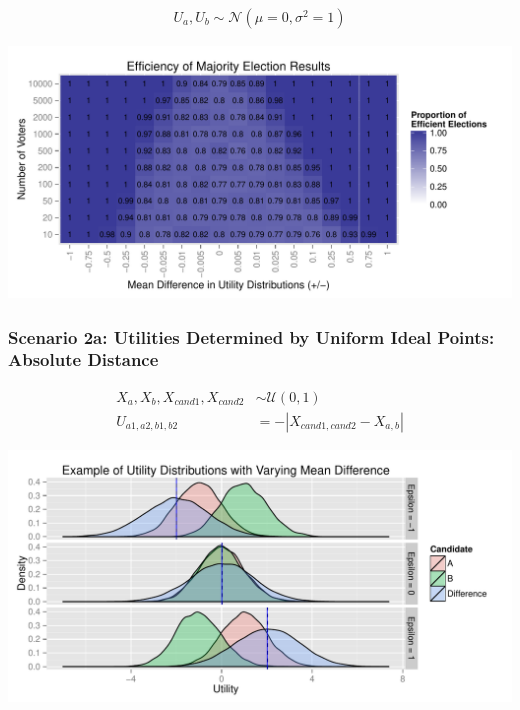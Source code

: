 \documentclass[12pt]{article}\usepackage[]{graphicx}\usepackage[]{color}
\makeatletter
\def\maxwidth{ %
  \ifdim\Gin@nat@width>\linewidth
    \linewidth
  \else
    \Gin@nat@width
  \fi
}
\newenvironment{knitrout}{}{} %
\makeatother
\begin{document}
\begin{align*}
U_a,U_b \sim \mathcal{N}(\mu=0,\sigma^2=1)
\end{align*}

\begin{knitrout}
\color{fgcolor}
\includegraphics[width=\maxwidth]{figure/unnamed-chunk-3} 

\end{knitrout}


\clearpage
\subsubsection*{Scenario 2a: Utilities Determined by Uniform Ideal Points: Absolute Distance}

\begin{align*}
X_a,X_b,X_{cand1},X_{cand2} &\sim \mathcal{U}(0,1) \\
U_{a1,a2,b1,b2} &= -|X_{cand1,cand2}-X_{a,b}|
\end{align*}

\begin{knitrout}
\color{fgcolor}
\includegraphics[width=\maxwidth]{figure/unnamed-chunk-4} 

\end{knitrout}
\end{document}
